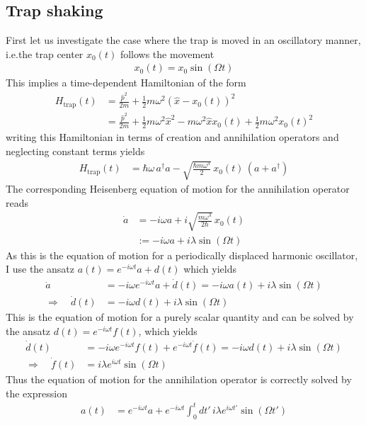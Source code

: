 \subsection{Trap shaking}
First let us investigate the case where the trap is moved in an oscillatory manner, i.e.the trap center $x_0(t)$ follows the movement
\begin{align*}
    x_0(t) = x_0 \sin(\Omega t)
\end{align*}
This implies a time-dependent Hamiltonian of the form
\begin{align*}
    H_\text{trap}(t)&= \frac{\hat{p}^2}{2m} + \frac{1}{2} m \omega^2 (\hat{x}-x_0(t))^2\\
    &= \frac{\hat{p}^2}{2m} + \frac{1}{2} m \omega^2 \hat{x}^2 - m \omega^2 \hat{x} x_0(t) + \frac{1}{2} m \omega^2 x_0(t)^2
\end{align*}
writing this Hamiltonian in terms of creation and annihilation operators and neglecting constant terms yields
\begin{align*}
    H_\text{trap}(t) &= \hbar \omega\,a^\dagger a - \sqrt{\frac{\hbar m \omega^3}{2}}\,x_0(t)\,(a+a^\dagger) 
\end{align*}
The corresponding Heisenberg equation of motion for the annihilation operator reads
\begin{align*}
    \dot{a} &= -i\omega a + i \sqrt{\frac{m \omega^3}{2\hbar}}\,x_0(t)\\
    &:= -i\omega a + i \lambda \sin(\Omega t)
\end{align*}
As this is the equation of motion for a periodically displaced harmonic oscillator, I use the ansatz $a(t)=e^{-i\omega t}a+d(t)$ which yields
\begin{align*}
    \dot{a}&= -i\omega e^{-i\omega t}a + \dot{d}(t)=-i\omega a(t)+ i\lambda \sin(\Omega t)\\
    \Rightarrow\quad \dot{d}(t)&= -i\omega d(t) + i\lambda \sin(\Omega t)
\end{align*}
This is the equation of motion for a purely scalar quantity and can be solved by the ansatz $d(t)=e^{-i\omega t}f(t)$, which yields
\begin{align*}
    \dot{d}(t)&= -i\omega e^{-i\omega t}f(t) + e^{-i\omega t}\dot{f}(t)=-i\omega d(t)+ i\lambda \sin(\Omega t)\\
    \Rightarrow \quad \dot{f}(t)&= i\lambda e^{i\omega t} \sin(\Omega t) 
\end{align*}
Thus the equation of motion for the annihilation operator is correctly solved by the expression
\begin{align*}
    a(t) &= e^{-i\omega t}a + e^{-i\omega t}\int_0^t dt'\, i\lambda e^{i\omega t'} \sin(\Omega t')
\end{align*}
